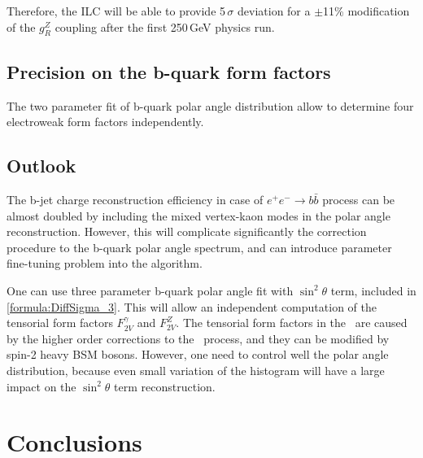 Therefore, the ILC will be able to provide 5\,$\sigma$ deviation for a $\pm$11\% modification of the $g_R^Z$ coupling after the first 250\,GeV physics run.

\subsection{Precision on the b-quark form factors}
The two parameter fit of b-quark polar angle distribution allow to determine four electroweak form factors independently.





\subsection{Outlook}
The b-jet charge reconstruction efficiency in case of $e^+e^-\to b\bar{b}$ process can be almost doubled by including the mixed vertex-kaon modes in the polar angle reconstruction. 
However, this will complicate significantly the correction procedure to the b-quark polar angle spectrum, and can introduce parameter fine-tuning problem into the algorithm.

One can use three parameter b-quark polar angle fit with $\sin^2 \theta$ term, included in \ref{formula:DiffSigma_3}. 
This will allow an independent computation of the tensorial form factors $F^\gamma_{2V}$ and $F^Z_{2V}$.
The tensorial form factors in the \sm\ are caused by the higher order corrections to the \bbbar\ process, and they can be modified by spin-2 heavy BSM bosons. 
However, one need to control well the polar angle distribution, because  even small variation of the histogram will have a large impact on the $\sin^2 \theta$ term reconstruction.
\section*{Conclusions}
